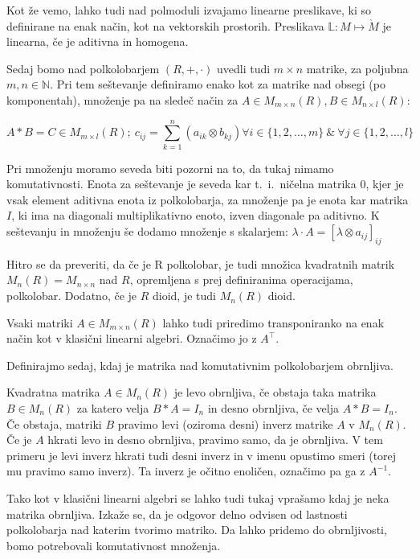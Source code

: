 \documentclass[mat1]{fmfdelo}
\newcommand{\N}{\mathbb{N}}
\begin{document}
Kot že vemo, lahko tudi nad polmoduli izvajamo linearne preslikave, ki so definirane na enak način, kot na vektorskih prostorih. Preslikava $\mathbb{L}: M \mapsto \grave{M}$ je linearna, če je aditivna in homogena.

Sedaj bomo nad polkolobarjem $(R, +, \cdot)$ uvedli tudi $m\times n$ matrike, za poljubna $m,n\in\N$. Pri tem seštevanje definiramo enako kot za matrike nad obsegi (po komponentah), množenje pa na sledeč način za $A\in M_{m\times n}(R), B\in M_{n\times l}(R)$:

$$ 
	A*B = C \in M_{m\times l}(R);~ c_{ij} = \sum_{k = 1}^{n}(a_{ik}\otimes b_{kj}) \forall i \in \{1, 2, \ldots, m\}~\&~\forall j \in \{1, 2, \ldots, l\}
$$

Pri množenju moramo seveda biti pozorni na to, da tukaj nimamo komutativnosti. Enota za seštevanje je seveda kar t.~i.~ničelna matrika $0$, kjer je vsak element aditivna enota iz polkolobarja, za množenje pa je enota kar matrika $I$, ki ima na diagonali multiplikativno enoto, izven diagonale pa aditivno. K seštevanju in množenju še dodamo množenje s skalarjem: $\lambda \cdot A = [\lambda \otimes a_{ij}]_{ij}$

Hitro se da preveriti, da če je R polkolobar, je tudi množica kvadratnih matrik $M_n(R) = M_{n\times n}$ nad $R$, opremljena s prej definiranima operacijama, polkolobar. Dodatno, če je $R$ dioid, je tudi $M_n(R)$ dioid.

Vsaki matriki $A\in M_{m\times n}(R)$ lahko tudi priredimo transponiranko na enak način kot v klasični linearni algebri. Označimo jo z $A^{\top}$.

Definirajmo sedaj, kdaj je matrika nad komutativnim polkolobarjem obrnljiva.

\begin{definicija}\label{def:invmatr}
	Kvadratna matrika $A\in M_n(R)$ je levo obrnljiva, če obstaja taka matrika $B\in M_n(R)$ za katero velja $B*A = I_n$ in desno obrnljiva, če velja $A*B = I_n$. Če obstaja, matriki $B$ pravimo levi (oziroma desni) inverz matrike $A$ v $M_n(R)$. Če je $A$ hkrati levo in desno obrnljiva, pravimo samo, da je obrnljiva. V tem primeru je levi inverz hkrati tudi desni inverz in v imenu opustimo smeri (torej mu pravimo samo inverz). Ta inverz je očitno enoličen, označimo pa ga z $A^{-1}$.
\end{definicija}

Tako kot v klasični linearni algebri se lahko tudi tukaj vprašamo kdaj je neka matrika obrnljiva. Izkaže se, da je odgovor delno odvisen od lastnosti polkolobarja nad katerim tvorimo matriko. Da lahko pridemo do obrnljivosti, bomo potrebovali komutativnost množenja.
\end{document}
